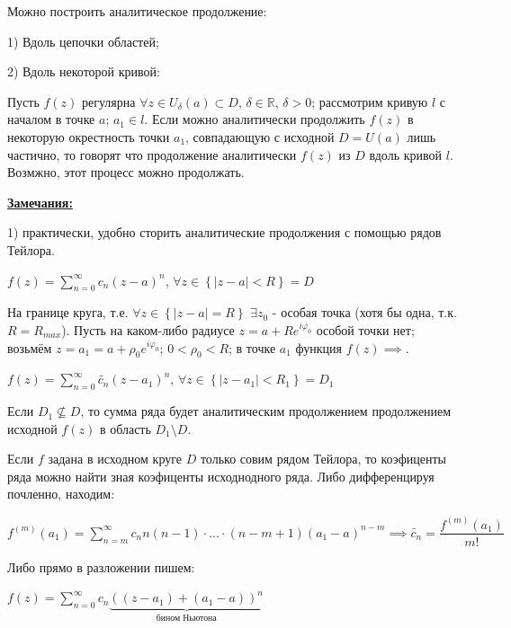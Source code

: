 \documentclass[a4paper, 12pt]{article}
\begin{document}
 \quad Можно построить аналитическое продолжение:
 
 1) Вдоль цепочки областей;
 
 2) Вдоль некоторой кривой:
 
 \quad Пусть $f(z)$ регулярна $\forall z \in U_{\delta}(a) \subset D$, $\delta \in \mathbb{R}$, $\delta > 0$; рассмотрим кривую $l$ с началом в точке $a$; $a_1 \in l$. Если можно аналитически продолжить $f(z)$ в некоторую окрестность точки $a_1$, совпадающую с исходной $D = U(a)$ лишь частично, то говорят что продолжение аналитически $f(z)$ из $D$ вдоль кривой $l$. Возмжно, этот процесс можно продолжать. 
 
 \quad \textbf{\underline{Замечания:}}

1) практически, удобно сторить аналитические продолжения с помощью рядов Тейлора. 

\begin{center}
	$f(z) = \displaystyle\sum\limits_{n=0}^{\infty} c_n (z-a)^n$, $\forall z \in \left\{ |z - a| < R \right\} = D$
\end{center} 

\quad На границе круга, т.е. $\forall z \in \left\{ |z - a| = R\right\}$ $\exists z_0$ - особая точка (хотя бы одна, т.к. $R = R_{max}$). Пусть на каком-либо радиусе  $z = a + Re^{i\varphi_0}$ особой точки нет; возьмём $z = a_1 = a + \rho_0 e^{i\varphi_0}$; $0 < \rho_0 < R$; в точке $a_1$ функция $f(z) \implies $.

\begin{center}
	$f(z) = \displaystyle\sum\limits_{n=0}^{\infty} \tilde{c_n} (z-a_1)^n$, $\forall z \in \left\{ |z - a_1| < R_1 \right\} = D_1$
\end{center} 

\quad Если $D_1 \nsubseteq D$, то сумма ряда будет аналитическим продолжением продолжением исходной $f(z)$ в область $D_1 \setminus D$.

\quad Если $f$ задана в исходном круге $D$ только совим рядом Тейлора, то коэфиценты ряда можно найти зная коэфиценты исходнодного ряда. Либо дифференцируя почленно, находим:

\begin{center} 
 	$f^{(m)}(a_1) = \displaystyle\sum\limits_{n=m}^{\infty} c_n n(n-1)\cdot ... \cdot (n-m+1)(a_1 - a)^{n-m} \implies \tilde{c_n} = \dfrac{f^{(m)} (a_1) }{m!}$
 \end{center} 	
 
 \quad Либо прямо в разложении пишем:
 
 \begin{center}
 	$f(z) = \displaystyle\sum\limits_{n=0}^{\infty} c_n \underbrace{((z-a_1) + (a_1 - a))^n}_{\text{бином Ньютона}}$
 \end{center}
 
\end{document}
